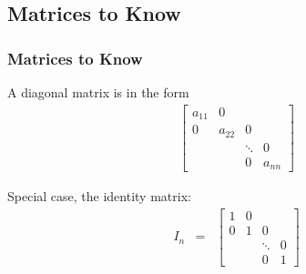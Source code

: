 \subsection{Matrices to Know}

\begin{frame}
  \frametitle{Matrices to Know}
  
  A diagonal matrix is in the form
  \begin{eqnarray*}
    \left[
      \begin{array}{rrrr}
        a_{11} & 0 & \\
        0 & a_{22} & 0 \\
        & & \ddots & 0\\
        & & 0 & a_{nn}
      \end{array}
    \right]
  \end{eqnarray*}

  Special case, the identity matrix:
  \begin{eqnarray*}
    I_n & = & 
    \left[
      \begin{array}{rrrr}
        1 & 0 & \\
        0 & 1 & 0 \\
        & & \ddots & 0 \\
        & & 0 & 1
      \end{array}
    \right]
  \end{eqnarray*}

\end{frame}


